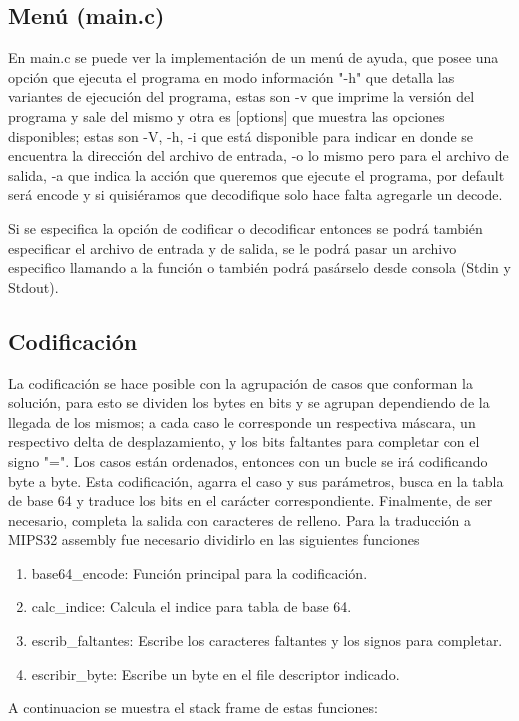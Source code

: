 \documentclass[a4paper,11pt, margin=1in]{article}
\begin{document}
\subsection{Menú (main.c)}
En  main.c se puede ver la implementación de un menú de ayuda, que posee una opción 
que ejecuta el programa en modo información "-h" que detalla las variantes de 
ejecución del programa, estas son -v que imprime la versión del programa y 
sale del mismo y otra es [options] que muestra las opciones disponibles; 
estas son -V, -h, -i que está disponible para indicar en donde se encuentra la dirección del archivo de entrada, 
-o lo mismo pero para el archivo de salida, 
-a que indica la acción que queremos que ejecute el programa, por default será encode 
y si quisiéramos que decodifique solo hace falta agregarle un decode.

Si se especifica la opción de codificar o decodificar entonces se podrá 
también especificar el archivo de entrada y de salida, se le podrá pasar un 
archivo especifico llamando a la función o también podrá pasárselo desde consola (Stdin y Stdout).

\newpage
\subsection{Codificación}
La codificación se hace posible con la agrupación de casos que conforman la solución, 
para esto se dividen los bytes en bits y se agrupan dependiendo de la llegada de los mismos; 
a cada caso le corresponde un respectiva máscara, un respectivo delta de desplazamiento, 
y los bits faltantes para completar con el signo "=". 
Los casos están ordenados, entonces con un bucle se irá codificando byte a byte. 
Esta codificación, agarra el caso y sus parámetros, busca en la tabla de base 64 
y traduce los bits en el carácter correspondiente. 
Finalmente, de ser necesario, completa la salida con caracteres de relleno.
\newline
Para la traducción a MIPS32 assembly fue necesario dividirlo en las siguientes funciones
\begin{enumerate}

\item base64\_encode: Función principal para la codificación.
\item calc\_indice: Calcula el indice para tabla de base 64.
\item escrib\_faltantes: Escribe los caracteres faltantes y los signos para completar.
\item escribir\_byte: Escribe un byte en el file descriptor indicado.

\end{enumerate}
A continuacion se muestra el stack frame de estas funciones:
\newline
\end{document}
